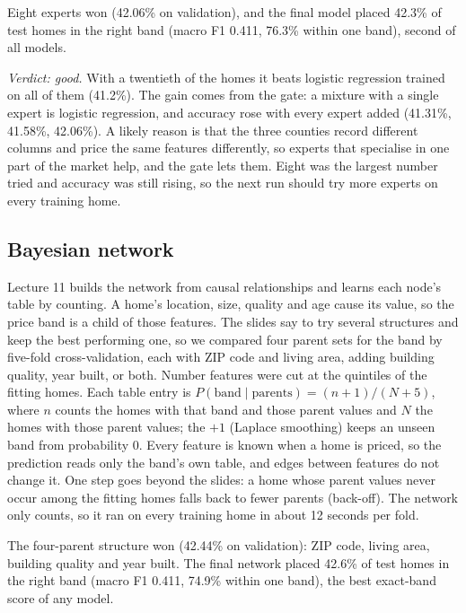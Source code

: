 \documentclass[sigconf,nonacm,10pt]{acmart}
\begin{document}
Eight experts won (42.06\% on validation), and the final model placed 42.3\% of test homes in the right band (macro F1 0.411, 76.3\% within one band), second of all models.

\emph{Verdict: good.} With a twentieth of the homes it beats logistic regression trained on all of them (41.2\%). The gain comes from the gate: a mixture with a single expert is logistic regression, and accuracy rose with every expert added (41.31\%, 41.58\%, 42.06\%). A likely reason is that the three counties record different columns and price the same features differently, so experts that specialise in one part of the market help, and the gate lets them. Eight was the largest number tried and accuracy was still rising, so the next run should try more experts on every training home.

\subsection{Bayesian network}
Lecture 11 builds the network from causal relationships and learns each node's table by counting. A home's location, size, quality and age cause its value, so the price band is a child of those features. The slides say to try several structures and keep the best performing one, so we compared four parent sets for the band by five-fold cross-validation, each with ZIP code and living area, adding building quality, year built, or both. Number features were cut at the quintiles of the fitting homes. Each table entry is $P(\text{band} \mid \text{parents}) = (n + 1)/(N + 5)$, where $n$ counts the homes with that band and those parent values and $N$ the homes with those parent values; the $+1$ (Laplace smoothing) keeps an unseen band from probability 0. Every feature is known when a home is priced, so the prediction reads only the band's own table, and edges between features do not change it. One step goes beyond the slides: a home whose parent values never occur among the fitting homes falls back to fewer parents (back-off). The network only counts, so it ran on every training home in about 12 seconds per fold.

The four-parent structure won (42.44\% on validation): ZIP code, living area, building quality and year built. The final network placed 42.6\% of test homes in the right band (macro F1 0.411, 74.9\% within one band), the best exact-band score of any model.
\end{document}
